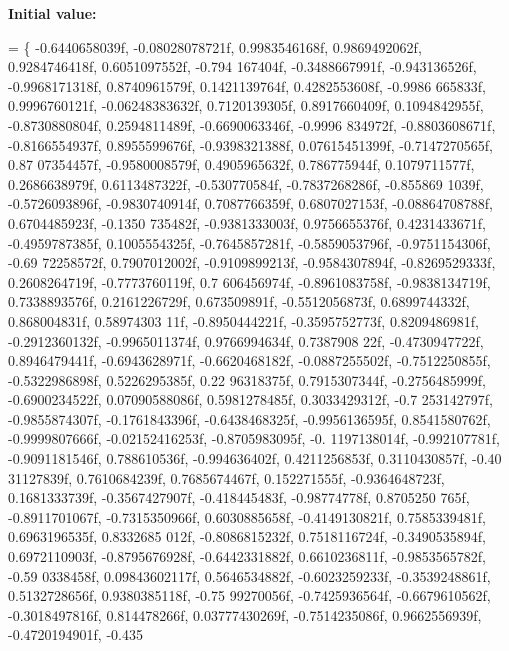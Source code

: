 {\bfseries Initial value\+:}
\begin{DoxyCode}
=
    \{
        -0.6440658039f, -0.08028078721f, 0.9983546168f, 0.9869492062f, 0.9284746418f, 0.6051097552f, -0.794
      167404f, -0.3488667991f, -0.943136526f, -0.9968171318f, 0.8740961579f, 0.1421139764f, 0.4282553608f, -0.9986
      665833f, 0.9996760121f, -0.06248383632f,
        0.7120139305f, 0.8917660409f, 0.1094842955f, -0.8730880804f, 0.2594811489f, -0.6690063346f, -0.9996
      834972f, -0.8803608671f, -0.8166554937f, 0.8955599676f, -0.9398321388f, 0.07615451399f, -0.7147270565f, 0.87
      07354457f, -0.9580008579f, 0.4905965632f,
        0.786775944f, 0.1079711577f, 0.2686638979f, 0.6113487322f, -0.530770584f, -0.7837268286f, -0.855869
      1039f, -0.5726093896f, -0.9830740914f, 0.7087766359f, 0.6807027153f, -0.08864708788f, 0.6704485923f, -0.1350
      735482f, -0.9381333003f, 0.9756655376f,
        0.4231433671f, -0.4959787385f, 0.1005554325f, -0.7645857281f, -0.5859053796f, -0.9751154306f, -0.69
      72258572f, 0.7907012002f, -0.9109899213f, -0.9584307894f, -0.8269529333f, 0.2608264719f, -0.7773760119f, 0.7
      606456974f, -0.8961083758f, -0.9838134719f,
        0.7338893576f, 0.2161226729f, 0.673509891f, -0.5512056873f, 0.6899744332f, 0.868004831f, 0.58974303
      11f, -0.8950444221f, -0.3595752773f, 0.8209486981f, -0.2912360132f, -0.9965011374f, 0.9766994634f, 0.7387908
      22f, -0.4730947722f, 0.8946479441f,
        -0.6943628971f, -0.6620468182f, -0.0887255502f, -0.7512250855f, -0.5322986898f, 0.5226295385f, 0.22
      96318375f, 0.7915307344f, -0.2756485999f, -0.6900234522f, 0.07090588086f, 0.5981278485f, 0.3033429312f, -0.7
      253142797f, -0.9855874307f, -0.1761843396f,
        -0.6438468325f, -0.9956136595f, 0.8541580762f, -0.9999807666f, -0.02152416253f, -0.8705983095f, -0.
      1197138014f, -0.992107781f, -0.9091181546f, 0.788610536f, -0.994636402f, 0.4211256853f, 0.3110430857f, -0.40
      31127839f, 0.7610684239f, 0.7685674467f,
        0.152271555f, -0.9364648723f, 0.1681333739f, -0.3567427907f, -0.418445483f, -0.98774778f, 0.8705250
      765f, -0.8911701067f, -0.7315350966f, 0.6030885658f, -0.4149130821f, 0.7585339481f, 0.6963196535f, 0.8332685
      012f, -0.8086815232f, 0.7518116724f,
        -0.3490535894f, 0.6972110903f, -0.8795676928f, -0.6442331882f, 0.6610236811f, -0.9853565782f, -0.59
      0338458f, 0.09843602117f, 0.5646534882f, -0.6023259233f, -0.3539248861f, 0.5132728656f, 0.9380385118f, -0.75
      99270056f, -0.7425936564f, -0.6679610562f,
        -0.3018497816f, 0.814478266f, 0.03777430269f, -0.7514235086f, 0.9662556939f, -0.4720194901f, -0.435

\end{DoxyCode}
